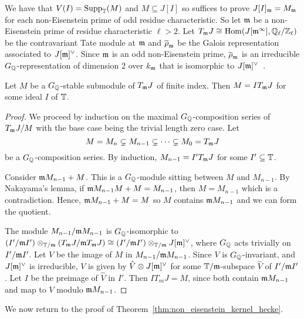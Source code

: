 \documentclass[11pt, proquest]{uwthesis}
\begin{document}
We have that $V(I)=\operatorname{Supp}_{\mathbb{T}}(M)$ and $M\subseteq J[I]$ so suffices to prove
$J[I]_{\mathfrak{m}} = M_{\mathfrak{m}}$ for each non-Eisenstein prime of odd residue characteristic.
So let $\mathfrak{m}$ be a non-Eisenstein prime of residue characteristic $\ell>2$. Let
$T_{\mathfrak{m}} J\cong \operatorname{Hom}(J[\mathfrak{m}^\infty], \mathbb{Q}_\ell/\mathbb{Z}_\ell)$ be the contravariant Tate
module at $\mathfrak{m}$ and $\overline{\rho}_{\mathfrak{m}}$ be the Galois representation associated
to $J[\mathfrak{m}]^\vee$. Since $\mathfrak{m}$ is an odd non-Eisenstein prime,
$\overline{\rho}_{\mathfrak{m}}$ is an irreducible $G_{\mathbb{Q}}$-representation of dimension 2
over $k_{\mathfrak{m}}$ that is isomorphic to $J[\mathfrak{m}]^\vee$~\cite[Prop.
14.2]{mazur:eisenstein}.

\begin{lemma}\label{lem:finite_index}
    Let $M$ be a $G_{\mathbb{Q}}$-stable submodule of $T_{\mathfrak{m}} J$ of finite index. Then
    $M=IT_{\mathfrak{m}} J$ for some ideal $I$ of $\mathbb{T}$.
\end{lemma}
\begin{proof}
    We proceed by induction on the maximal $G_{\mathbb{Q}}$-composition series of $T_{\mathfrak{m}} J/M$
    with the base case being the trivial length zero case. Let 
    \[
        M = M_n \subsetneq M_{n-1} \subsetneq \cdots \subsetneq M_0 = T_{\mathfrak{m}} J
    \]
    be a $G_{\mathbb{Q}}$-composition series. By induction, $M_{n-1} = I'T_{\mathfrak{m}} J$ for some
    $I'\subseteq \mathbb{T}$.

    Consider $\mathfrak{m} M_{n-1} + M$. This is a $G_{\mathbb{Q}}$-module sitting between $M$ and
    $M_{n-1}$. By Nakayama's lemma, if $\mathfrak{m} M_{n-1} M + M = M_{n-1}$, then
    $M=M_{n-1}$ which is a contradiction. Hence, $\mathfrak{m} M_{n-1}+M=M$ so $M$
    contains $\mathfrak{m} M_{n-1}$ and we can form the quotient.

    The module $M_{n-1}/\mathfrak{m} M_{n-1}$ is $G_{\mathbb{Q}}$-isomorphic to $(I'/\mathfrak{m}
    I')\otimes_{\mathbb{T}/\mathfrak{m}} (T_{\mathfrak{m}} J/\mathfrak{m} T_{\mathfrak{m}} J) \cong (I'/\mathfrak{m} I')\otimes_{\mathbb{T}/\mathfrak{m}}
    J[\mathfrak{m}]^\vee$, where $G_{\mathbb{Q}}$ acts trivially on $I'/\mathfrak{m} I'$. Let $V$ be the image
    of $M$ in $M_{n-1}/\mathfrak{m} M_{n-1}$. Since $V$ is $G_{\mathbb{Q}}$-invariant, and
    $J[\mathfrak{m}]^\vee$ is irreducible, $V$ is given by $\hat{V}\otimes J[\mathfrak{m}]^\vee$
    for some $\mathbb{T}/\mathfrak{m}$-subspace $\hat{V}$ of $I'/\mathfrak{m} I'$. Let $I$ be the preimage
    of $\hat{V}$ in $I'$. Then $IT_m J = M$, since both contain $\mathfrak{m} M_{n-1}$
    and map to $V$ modulo $\mathfrak{m} M_{n-1}$.
\end{proof}

We now return to the proof of Theorem~\ref{thm:non_eisenstein_kernel_hecke}.
\end{document}
